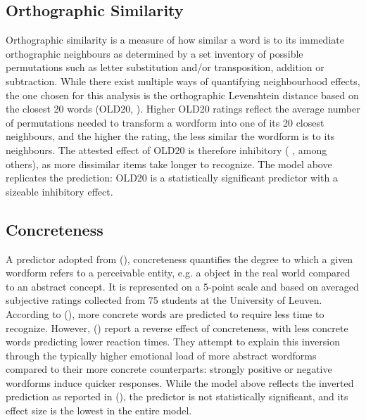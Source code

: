 \subsection{Orthographic Similarity} \label{subsec:old20}
Orthographic similarity is a measure of how similar a word is to its immediate orthographic neighbours as determined by a set inventory of possible permutations such as letter substitution and/or transposition, addition or subtraction. While there exist multiple ways of quantifying neighbourhood effects, the one chosen for this analysis is the orthographic Levenshtein distance based on the closest 20 words (OLD20, \citeauthor{Yarkoni+etal+2008} \citeyear{Yarkoni+etal+2008}). Higher OLD20 ratings reflect the average number of permutations needed to transform a wordform into one of its 20 closest neighbours, and the higher the rating, the less similar the wordform is to its neighbours. The attested effect of OLD20 is therefore inhibitory (\citeauthor{Brysbaert+etal+2016} \citeyear{Brysbaert+etal+2016}, among others), as more dissimilar items take longer to recognize. The model above replicates the prediction: OLD20 is a statistically significant predictor with a sizeable inhibitory effect.
\subsection{Concreteness} \label{subsec:concreteness}
A predictor adopted from \citeauthor{Brysbaert+etal+2014} (\citeyear{Brysbaert+etal+2014}), concreteness quantifies the degree to which a given wordform refers to a perceivable entity, e.g. a object in the real world compared to an abstract concept. It is represented on a 5-point scale and based on averaged subjective ratings collected from 75 students at the University of Leuven. According to \citeauthor{Brysbaert+etal+2014} (\citeyear{Brysbaert+etal+2014}), more concrete words are predicted to require less time to recognize. However, \citeauthor{Brysbaert+etal+2016} (\citeyear{Brysbaert+etal+2016}) report a reverse effect of concreteness, with less concrete words predicting lower reaction times. They attempt to explain this inversion through the typically higher emotional load of more abstract wordforms compared to their more concrete counterparts: strongly positive or negative wordforms induce quicker responses. While the model above reflects the inverted prediction as reported in \citeauthor{Brysbaert+etal+2016} (\citeyear{Brysbaert+etal+2016}), the predictor is not statistically significant, and its effect size is the lowest in the entire model.
